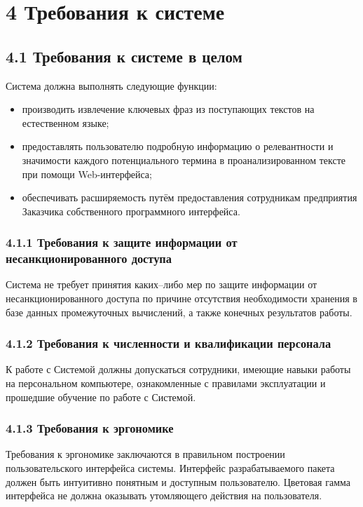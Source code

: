\section*{4 Требования к системе}
\subsection*{4.1 Требования к системе в целом}
Система должна выполнять следующие функции:
\begin{itemize}
  \item производить извлечение ключевых фраз из поступающих
текстов на естественном языке;
  \item предоставлять пользователю подробную информацию о
релевантности и значимости каждого потенциального термина в
проанализированном тексте при помощи Web-интерфейса;
  \item обеспечивать расширяемость путём предоставления
сотрудникам предприятия Заказчика собственного программного
интерфейса.
\end{itemize}

\subsubsection*{4.1.1 Требования к защите информации от несанкционированного доступа}
Система не требует принятия каких--либо мер по защите
информации от несанкционированного доступа по причине
отсутствия необходимости хранения в базе данных промежуточных
вычислений, а также конечных результатов работы.

\subsubsection*{4.1.2 Требования к численности и квалификации персонала}
К работе с Системой должны допускаться сотрудники, имеющие навыки
работы на персональном компьютере, ознакомленные с правилами
эксплуатации и прошедшие обучение по работе с Системой.

\subsubsection*{4.1.3 Требования к эргономике}
Требования к эргономике заключаются в правильном построении
пользовательского интерфейса системы. Интерфейс разрабатываемого
пакета должен быть интуитивно понятным и доступным пользователю.
Цветовая гамма интерфейса не должна оказывать утомляющего действия
на пользователя.

